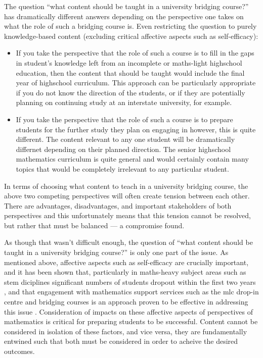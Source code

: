 \documentclass[twoside,12pt,a4paper]{report}
\begin{document}
The question ``what content should be taught in a university bridging course?'' has dramatically different answers depending on the perspective one takes on what the role of such a bridging course is. Even restricting the question to purely knowledge-based content (excluding critical affective aspects such as self-efficacy):
\begin{itemize}
	\item If you take the perspective that the role of such a course is to fill in the gaps in student's knowledge left from an incomplete or maths-light highschool education, then the content that should be taught would include the final year of highschool curriculum. This approach can be particularly appropriate if you do not know the direction of the students, or if they are potentially planning on continuing study at an interstate university, for example.
	\item If you take the perspective that the role of such a course is to prepare students for the further study they plan on engaging in however, this is quite different. The content relevant to any one student will be dramatically differnet depending on their planned direction. The senior highschool mathematics curriculum is quite general and would certainly contain many topics that would be completely irrelevant to any particular student. 
\end{itemize}
In terms of choosing what content to teach in a university bridging course, the above two competing perspectives will often create tension between each other. There are advantages, disadvantages, and important stakeholders of both perspectives and this unfortunately means that this tension cannot be resolved, but rather that must be balanced --- a compromise found.

As though that wasn't difficult enough, the question of ``what content should be taught in a university bridging course?'' is only one part of the issue. As mentioned above, affective aspects such as self-efficacy are crucially important, and it has been shown that, particularly in maths-heavy subject areas such as \gls{stem} diciplines significant numbers of students dropout within the first two years \cite{House2000, Tsui2007}, and that engagement with mathematics support services such as the \gls{mlc} drop-in centre and bridging courses is an approach proven to be effective in addressing this issue \cite{Lee2008}. Consideration of impacts on these affective aspects of perspectives of mathematics is critical for preparing students to be successful. Content cannot be considered in isolation of these factors, and vice versa, they are fundamentally entwined such that both must be considered in order to acheive the desired outcomes.
\end{document}
